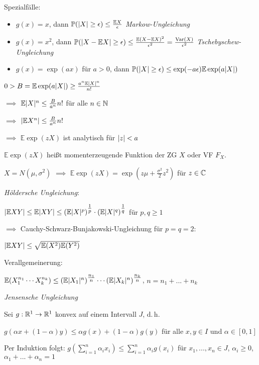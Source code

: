 \documentclass{cheat-sheet}
\renewcommand{\P}{\mathbb{P}} %
\newcommand{\E}{\mathbb{E}} %
\newcommand{\Var}{\mathrm{Var}} %
\begin{document}
Spezialfälle:

\begin{itemize}
  \item $g(x) = x$, dann $\P(\abs{X} \geq \epsilon) \leq \frac{\E X}{\epsilon}$ \emph{Markow-Ungleichung}
  \item $g(x) = x^2$, dann $\P(\abs{X - \E X} \geq \epsilon) \leq \frac{\E (X - \E X)^2}{\epsilon^2} = \frac{\Var(X)}{\epsilon^2}$ \emph{Tschebyschew-Ungleichung}
  \item $g(x) = \exp(ax)$ für $a > 0$, dann $\P(\abs{X} \geq \epsilon) \leq \exp(-a\epsilon) \E \exp(a \abs{X})$
\end{itemize}

$0 > B = \E \exp(a \abs{X}) \geq \frac{a^n \E \abs{X}^n}{n!}$

$\implies$ $\E \abs{X}^n \leq \tfrac{B}{a^n} n!$ für alle $n \in \mathbb{N}$

$\implies$ $\abs{\E X^n} \leq \tfrac{B}{a^n} n!$

$\implies$ $\E \exp(z X)$ ist analytisch für $\lvert z\rvert < a$

\begin{defn}
  $\E \exp(z X)$ heißt momenterzeugende Funktion der ZG $X$ oder VF $F_X$.
\end{defn}

$X = N(\mu, \sigma^2)$ $\implies$ $\E \exp(z X) = \exp\left( z\mu + \tfrac{\sigma^2}{2} z^2 \right)$ für $z \in \mathbb{C}$

\emph{Höldersche Ungleichung}:

$\abs{\E X Y} \leq \E \abs{XY} \leq (\E \abs{X}^p)^{\tfrac{1}{p}} \cdot (\E \abs{X}^q)^{\tfrac{1}{q}}$ für $p, q \geq 1$

$\implies$ Cauchy-Schwarz-Bunjakowski-Ungleichung für $p = q = 2$:

$\abs{\E XY} \leq \sqrt{ \E (X^2) \E(Y^2) }$

Verallgemeinerung:

$\E(X_1^{n_1} \cdots X_k^{n_k}) \leq (\E \abs{X_1}^n)^{\tfrac{n_1}{n}} \cdots (\E \abs{X_k}^n)^{\tfrac{n_k}{n}}$, $n = n_1 + ... + n_k$

\emph{Jensensche Ungleichung}

Sei $g : \mathbb{R}^1 \to \mathbb{R}^1$ konvex auf einem Intervall $J$, d.\,h.

$g(\alpha x + (1-\alpha)y) \leq \alpha g(x) + (1-\alpha) g(y)$ für alle $x, y \in I$ und $\alpha \in [0,1]$

Per Induktion folgt: $g(\sum_{i=1}^n \alpha_i x_i) \leq \sum_{i=1}^n \alpha_i g(x_i)$ für $x_1, ..., x_n \in J$, $\alpha_i \geq 0$, $\alpha_1 + ... + \alpha_n = 1$
\end{document}
